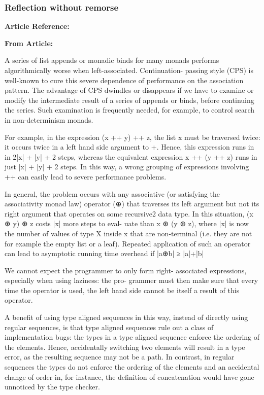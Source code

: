 \documentclass{article}
\begin{document}
\subsubsection{Reflection without remorse}

\textbf{Article Reference:} \cite{conf/haskell/PloegKiselyov14}

\textbf{From Article:}

A series of list appends or monadic binds for many monads performs algorithmically worse when left-associated. Continuation- passing style (CPS) is well-known to cure this severe dependence of performance on the association pattern. The advantage of CPS dwindles or disappears if we have to examine or modify the intermediate result of a series of appends or binds, before continuing the series. Such examination is frequently needed, for example, to control search in non-determinism monads.

For example, in the expression (x ++ y) ++ z, the list x must be traversed twice: it occurs twice in a left hand side argument to +. Hence, this expression runs in in 2|x| + |y| + 2 steps, whereas the equivalent expression x ++ (y ++ z) runs in just |x| + |y| + 2 steps. In this way, a wrong grouping of expressions involving ++ can easily lead to severe performance problems. 

In general, the problem occurs with any associative (or satisfying the associativity monad law) operator (⊕) that traverses its left argument but not its right argument that operates on some recursive2 data type. In this situation, (x ⊕ y) ⊕ z costs |x| more steps to eval- uate than x ⊕ (y ⊕ z), where |x| is now the number of values of type X inside x that are non-terminal (i.e. they are not for example the empty list or a leaf). Repeated application of such an operator can lead to asymptotic running time overhead if |a⊕b| ≥ |a|+|b|

We cannot expect the programmer to only form right- associated expressions, especially when using laziness: the pro- grammer must then make sure that every time the operator is used, the left hand side cannot be itself a result of this operator.

A benefit of using type aligned sequences in this way, instead of directly using regular sequences, is that type aligned sequences rule out a class of implementation bugs: the types in a type aligned sequence enforce the ordering of the elements. Hence, accidentally switching two elements will result in a type error, as the resulting sequence may not be a path. In contrast, in regular sequences the types do not enforce the ordering of the elements and an accidental change of order in, for instance, the definition of concatenation would have gone unnoticed by the type checker.
\end{document}
